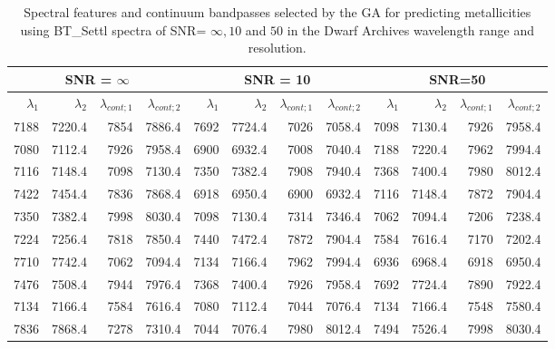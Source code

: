 \begin{table*}
\begin{center}
\begin{tabular}{rrrr | rrrr | rrrr }
  \hline
 \multicolumn{4}{c}{SNR = $\infty $} & \multicolumn{4}{c}{SNR = 10} &  \multicolumn{4}{c}{SNR=50} \\
  \hline
$\lambda_1$ & $\lambda_2$ & $\lambda_{cont;1}$ & $\lambda_{cont;2} $ & $\lambda_1$ & $\lambda_2$ & $\lambda_{cont;1}$ & $\lambda_{cont;2} $ & $\lambda_1$ & $\lambda_2$ & $\lambda_{cont;1}$ & $\lambda_{cont;2} $ \\ 
  \hline
7188 & 7220.4 &	7854 & 7886.4 & 7692 & 7724.4 &	7026 & 7058.4  &  7098 & 7130.4 & 7926 & 7958.4 \\
7080 & 7112.4 &	7926 & 7958.4 & 6900 & 6932.4 &	7008 & 7040.4  &  7188 & 7220.4 & 7962 & 7994.4  \\
7116 & 7148.4 &	7098 & 7130.4 & 7350 & 7382.4 &	7908 & 7940.4  &  7368 & 7400.4 & 7980 & 8012.4  \\
7422 & 7454.4 &	7836 & 7868.4 & 6918 & 6950.4 &	6900 & 6932.4  &  7116 & 7148.4 & 7872 & 7904.4  \\
7350 & 7382.4 &	7998 & 8030.4 & 7098 & 7130.4 &	7314 & 7346.4  &  7062 & 7094.4 & 7206 & 7238.4  \\
7224 & 7256.4 &	7818 & 7850.4 & 7440 & 7472.4 &	7872 & 7904.4  &  7584 & 7616.4 & 7170 & 7202.4  \\
7710 & 7742.4 &	7062 & 7094.4 & 7134 & 7166.4 &	7962 & 7994.4  &  6936 & 6968.4 & 6918 & 6950.4  \\
7476 & 7508.4 &	7944 & 7976.4 & 7368 & 7400.4 &	7926 & 7958.4  &  7692 & 7724.4 & 7890 & 7922.4  \\
7134 & 7166.4 &	7584 & 7616.4 & 7080 & 7112.4 &	7044 & 7076.4  &  7134 & 7166.4 & 7548 & 7580.4  \\
7836 & 7868.4 &	7278 & 7310.4 & 7044 & 7076.4 &	7980 & 8012.4  &  7494 & 7526.4 & 7998 & 8030.4  \\
\hline
\end{tabular}
\caption {Spectral features and continuum bandpasses selected by the
  GA for predicting metallicities using BT\_Settl spectra of SNR= $\infty , 10 $
  and $ 50 $ in the Dwarf Archives wavelength range and
  resolution.} \label{tab:ipac-met-noisy}
\end{center}
\end{table*}

